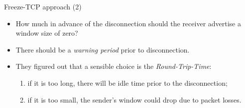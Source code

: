 \begin{frame}{Freeze-TCP approach (2)}
       \begin{itemize}
		\item How much in advance of the disconnection should the receiver advertise a window size of zero?
		\item There should be a \textit{warning period} prior to disconnection.
		\item They figured out that a sensible choice is the \textit{Round-Trip-Time}:
	           \begin{enumerate}
			\item if it is too long, there will be idle time
			      prior to the disconnection;
			\item if it is too small, the sender's window could
			      drop due to packet losses.
		   \end{enumerate}
       \end{itemize}

\end{frame}


